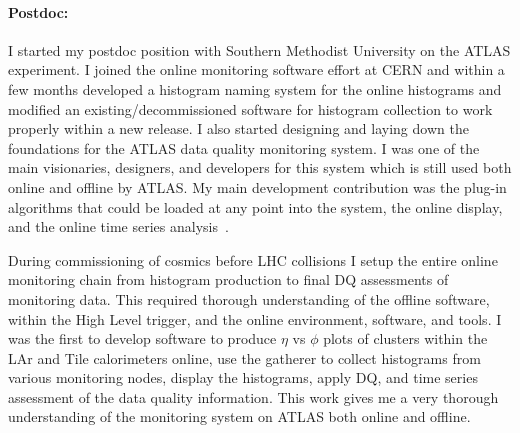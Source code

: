 \paragraph{Postdoc:}I started my postdoc position with Southern Methodist University on the ATLAS experiment.  I joined the online monitoring software effort at CERN and within a few months developed a histogram
naming system for the online histograms and modified an existing/decommissioned software for histogram collection to work properly within a new release.  
I also started designing and laying down the foundations for the ATLAS data quality monitoring system.  I was one of the main visionaries, designers, and developers for this system
which is still used both online and offline by ATLAS. My main development contribution was the plug-in algorithms that could be loaded at any point into the system, the online display, and the online time series analysis~\cite{atl5b,atl6}.

During commissioning of cosmics before LHC collisions I setup the entire online monitoring chain from histogram production to final DQ assessments of monitoring data.  This required thorough understanding
of the offline software, within the High Level trigger, and the online environment, software, and tools.  I was the first to develop software to produce $\eta$ vs $\phi$ plots of clusters within the LAr and Tile calorimeters online, use the gatherer to
collect histograms from various monitoring nodes, display the histograms, apply DQ, and time series assessment of the data quality information.  This work gives me a very thorough understanding of the monitoring system on ATLAS both online and offline.

